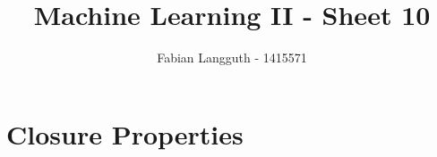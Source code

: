 \documentclass[a4paper,11pt]{scrartcl}
\title{Machine Learning II - Sheet 10}
\author{Fabian Langguth - 1415571}
\begin{document}
\maketitle

\section{Closure Properties}
\end{document}
